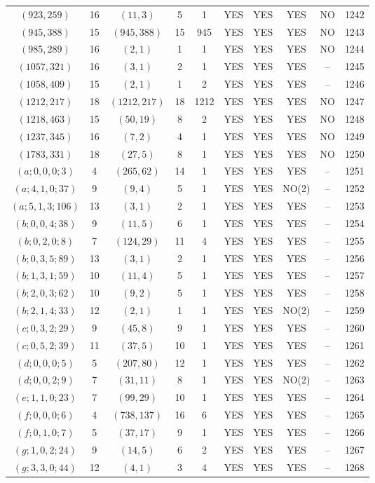 \begin{longtable}{|c|c|c|c|c|c|c|c|c|c|}
$(923, 259)$ & 16 & $(11, 3)$ & 5 & 1 & YES & YES & YES & NO & 1242\\
$(945, 388)$ & 15 & $(945, 388)$ & 15 & 945 & YES & YES & YES & NO & 1243\\
$(985, 289)$ & 16 & $(2, 1)$ & 1 & 1 & YES & YES & YES & NO & 1244\\
$(1057, 321)$ & 16 & $(3, 1)$ & 2 & 1 & YES & YES & YES & -- & 1245\\
$(1058, 409)$ & 15 & $(2, 1)$ & 1 & 2 & YES & YES & YES & -- & 1246\\
$(1212, 217)$ & 18 & $(1212, 217)$ & 18 & 1212 & YES & YES & YES & NO & 1247\\
$(1218, 463)$ & 15 & $(50, 19)$ & 8 & 2 & YES & YES & YES & NO & 1248\\
$(1237, 345)$ & 16 & $(7, 2)$ & 4 & 1 & YES & YES & YES & NO & 1249\\
$(1783, 331)$ & 18 & $(27, 5)$ & 8 & 1 & YES & YES & YES & NO & 1250\\
$(a; 0, 0, 0; 3)$ & 4 & $(265, 62)$ & 14 & 1 & YES & YES & YES & -- & 1251\\
$(a; 4, 1, 0; 37)$ & 9 & $(9, 4)$ & 5 & 1 & YES & YES & NO(2) & -- & 1252\\
$(a; 5, 1, 3; 106)$ & 13 & $(3, 1)$ & 2 & 1 & YES & YES & YES & -- & 1253\\
$(b; 0, 0, 4; 38)$ & 9 & $(11, 5)$ & 6 & 1 & YES & YES & YES & -- & 1254\\
$(b; 0, 2, 0; 8)$ & 7 & $(124, 29)$ & 11 & 4 & YES & YES & YES & -- & 1255\\
$(b; 0, 3, 5; 89)$ & 13 & $(3, 1)$ & 2 & 1 & YES & YES & YES & -- & 1256\\
$(b; 1, 3, 1; 59)$ & 10 & $(11, 4)$ & 5 & 1 & YES & YES & YES & -- & 1257\\
$(b; 2, 0, 3; 62)$ & 10 & $(9, 2)$ & 5 & 1 & YES & YES & YES & -- & 1258\\
$(b; 2, 1, 4; 33)$ & 12 & $(2, 1)$ & 1 & 1 & YES & YES & NO(2) & -- & 1259\\
$(c; 0, 3, 2; 29)$ & 9 & $(45, 8)$ & 9 & 1 & YES & YES & YES & -- & 1260\\
$(c; 0, 5, 2; 39)$ & 11 & $(37, 5)$ & 10 & 1 & YES & YES & YES & -- & 1261\\
$(d; 0, 0, 0; 5)$ & 5 & $(207, 80)$ & 12 & 1 & YES & YES & YES & -- & 1262\\
$(d; 0, 0, 2; 9)$ & 7 & $(31, 11)$ & 8 & 1 & YES & YES & NO(2) & -- & 1263\\
$(e; 1, 1, 0; 23)$ & 7 & $(99, 29)$ & 10 & 1 & YES & YES & YES & -- & 1264\\
$(f; 0, 0, 0; 6)$ & 4 & $(738, 137)$ & 16 & 6 & YES & YES & YES & -- & 1265\\
$(f; 0, 1, 0; 7)$ & 5 & $(37, 17)$ & 9 & 1 & YES & YES & YES & -- & 1266\\
$(g; 1, 0, 2; 24)$ & 9 & $(14, 5)$ & 6 & 2 & YES & YES & YES & -- & 1267\\
$(g; 3, 3, 0; 44)$ & 12 & $(4, 1)$ & 3 & 4 & YES & YES & YES & -- & 1268
\end{longtable}
